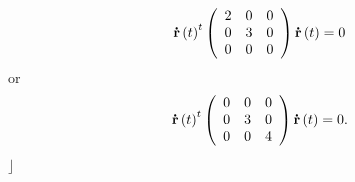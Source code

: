 \documentclass[aps,preprint]{revtex4}%
\begin{document}
\begin{equation}
\mathbf{\dot{r}}\left(  t\right)  ^{t}\left(
\begin{array}
[c]{ccc}%
2 & 0 & 0\\
0 & 3 & 0\\
0 & 0 & 0
\end{array}
\right)  \mathbf{\dot{r}}\left(  t\right)  =0
\end{equation}
or%
\begin{equation}
\mathbf{\dot{r}}\left(  t\right)  ^{t}\left(
\begin{array}
[c]{ccc}%
0 & 0 & 0\\
0 & 3 & 0\\
0 & 0 & 4
\end{array}
\right)  \mathbf{\dot{r}}\left(  t\right)  =0.
\end{equation}
$\rfloor$
\end{document}
